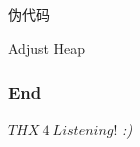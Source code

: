 \documentclass{ldr-simple-gray}
\begin{document}
  \begin{frame}{伪代码}
    \begin{algorithm}[H]
      \caption{Adjust Heap}
      \begin{algorithmic}[1]
          \ENDIF
          \ENDIF
        \ENDFOR
      \end{algorithmic}
    \end{algorithm}
  \end{frame}

  \begin{frame} %
    \frametitle{End}
    \begin{center}
      \Huge{$THX\ 4\ Listening!$}
      \emph{:)}
    \end{center}
  \end{frame}
\end{document}

